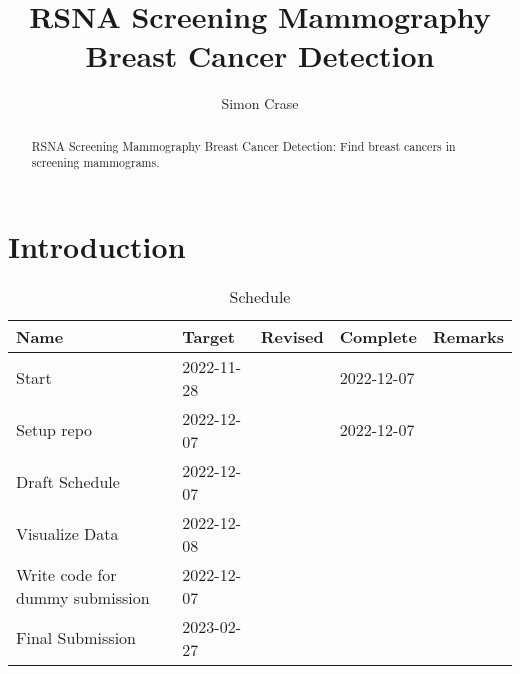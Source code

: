 \documentclass[]{article}
\title{RSNA Screening Mammography Breast Cancer Detection}
\author{Simon Crase}
\begin{document}
\maketitle

\begin{abstract}
RSNA Screening Mammography Breast Cancer Detection: Find breast cancers in screening mammograms. \cite{rsna-breast-cancer-detection}
\end{abstract}

\section{Introduction}
\begin{table}[H]
	\begin{center}
		\caption{Schedule}
		\begin{tabular}{|l|l|l|l|l|} \hline
			Name&Target&Revised&Complete&Remarks \\  \hline
			Start&2022-11-28&&2022-12-07&\\ 		 \hline
			Setup repo&2022-12-07&&2022-12-07&\\ 		 \hline
			Draft Schedule&2022-12-07&&&\\ 		 \hline
			Visualize Data&2022-12-08&&&\\ 		 \hline
			Write code for dummy submission&2022-12-07&&&\\ 		 \hline
			Final Submission&2023-02-27&&&\\ 		 \hline
		\end{tabular}
	\end{center}
\end{table}



\end{document}
